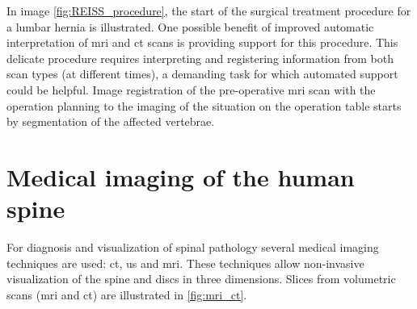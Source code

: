 \par{
    In image \ref{fig:REISS_procedure}, the start of the surgical treatment procedure for a lumbar hernia is illustrated.
    One possible benefit of improved automatic interpretation of \acrshort{mri} and \acrshort{ct} scans is providing support for this procedure.
    This delicate procedure requires interpreting and registering information from both scan types (at different times), a demanding task for which automated support could be helpful.
    Image registration of the pre-operative \acrshort{mri} scan with the operation planning to the imaging of the situation on the operation table starts by segmentation of the affected vertebrae.
}

\section{Medical imaging of the human spine\label{sec:medical_imaging}}
\par{
    For diagnosis and visualization of spinal pathology several medical imaging techniques are used: \acrfull{ct}, \acrfull{us} and \acrfull{mri}. 
    These techniques allow non-invasive visualization of the spine and discs in three dimensions.
    Slices from volumetric scans (\acrshort{mri} and \acrshort{ct}) are illustrated in \ref{fig:mri_ct}.
}

